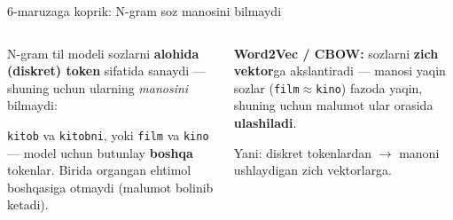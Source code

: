 \documentclass[aspectratio=169,11pt]{beamer}
\newcommand{\uzq}{\textquotesingle{}}
\begin{document}
\begin{frame}{6-ma\uzq{}ruzaga ko\uzq{}prik: N-gram so\uzq{}z ma\uzq{}nosini bilmaydi}
\footnotesize
\begin{columns}[T,totalwidth=\textwidth]
\begin{column}{0.54\textwidth}
N-gram til modeli so\uzq{}zlarni \textbf{alohida (diskret) token} sifatida sanaydi ---
shuning uchun ularning \emph{ma\uzq{}nosini} bilmaydi:
\vspace{3pt}
\begin{tcolorbox}[warnbox,left=2mm,right=2mm,top=1mm,bottom=1mm]
\scriptsize
\texttt{kitob} va \texttt{kitobni}, yoki \texttt{film} va \texttt{kino} --- model uchun
butunlay \textbf{boshqa} tokenlar. Birida o\uzq{}rgangan ehtimol boshqasiga o\uzq{}tmaydi
(ma\uzq{}lumot bo\uzq{}linib ketadi).
\end{tcolorbox}
\end{column}
\begin{column}{0.42\textwidth}
\begin{tcolorbox}[defbox,title=6-ma\uzq{}ruza]
\scriptsize
\textbf{Word2Vec / CBOW:} so\uzq{}zlarni \textbf{zich vektor}ga akslantiradi ---
ma\uzq{}nosi yaqin so\uzq{}zlar (\texttt{film}$\approx$\texttt{kino}) fazoda yaqin,
shuning uchun ma\uzq{}lumot ular orasida \textbf{ulashiladi}.
\end{tcolorbox}
\vspace{3pt}
{\scriptsize\color{halfgray} Ya\uzq{}ni: diskret tokenlardan $\to$ ma\uzq{}noni
ushlaydigan zich vektorlarga.}
\end{column}
\end{columns}
\end{frame}
\end{document}
